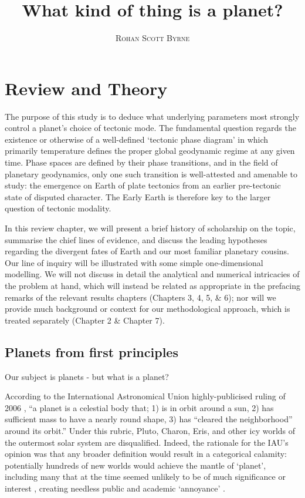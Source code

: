 \documentclass[a4paper,11pt,oneside]{book}
\title{\Huge \textbf{What kind of thing is a planet?}}
\author{\textsc{Rohan Scott Byrne}}
\begin{document}
\sloppy

\frontmatter
\maketitle

\tableofcontents

\mainmatter

% 
% 

\cite{Sarma2008-wu}

\section{Review and Theory}

The purpose of this study is to deduce what underlying parameters most strongly control a planet's choice of tectonic mode. The fundamental question regards the existence or otherwise of a well-defined `tectonic phase diagram' in which primarily temperature defines the proper global geodynamic regime at any given time. Phase spaces are defined by their phase transitions, and in the field of planetary geodynamics, only one such transition is well-attested and amenable to study: the emergence on Earth of plate tectonics from an earlier pre-tectonic state of disputed character. The Early Earth is therefore key to the larger question of tectonic modality.

In this review chapter, we will present a brief history of scholarship on the topic, summarise the chief lines of evidence, and discuss the leading hypotheses regarding the divergent fates of Earth and our most familiar planetary cousins. Our line of inquiry will be illustrated with some simple one-dimensional modelling. We will not discuss in detail the analytical and numerical intricacies of the problem at hand, which will instead be related as appropriate in the prefacing remarks of the relevant results chapters (Chapters 3, 4, 5, \& 6); nor will we provide much background or context for our methodological approach, which is treated separately (Chapter 2 \& Chapter 7).

\subsection{Planets from first principles}

Our subject is planets - but what is a planet?

According to the International Astronomical Union highly-publicised ruling of 2006 \cite{International_Astronomical_Union2006-ft}, ``a planet is a celestial body that; 1) is in orbit around a sun, 2) has sufficient mass to have a nearly round shape, 3) has ``cleared the neighborhood'' around its orbit.'' Under this rubric, Pluto, Charon, Eris, and other icy worlds of the outermost solar system are disqualified. Indeed, the rationale for the IAU's opinion was that any broader definition would result in a categorical calamity: potentially hundreds of new worlds would achieve the mantle of `planet', including many that at the time seemed unlikely to be of much significance or interest \cite{Sarma2008-wu}, creating needless public and academic `annoyance' \cite{Basri2006-vw}.
\end{document}
